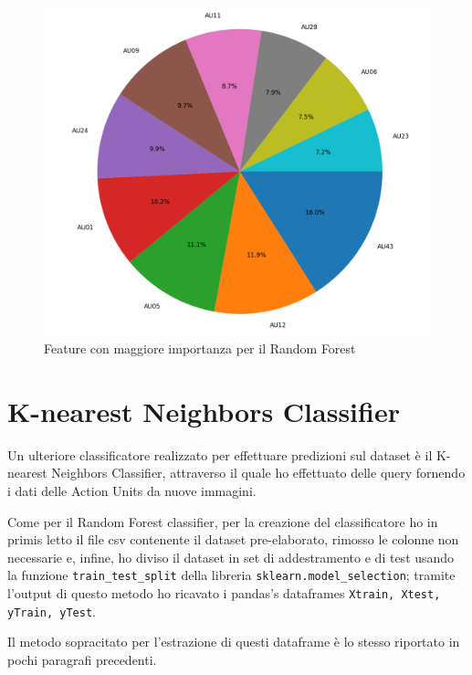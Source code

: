 \begin{figure}
    \begin{center}    
        \includegraphics[width=1\linewidth]{images/image37.png}
        \caption{Feature con maggiore importanza per il Random Forest}
        \label{fig:image14}
    \end{center}
\end{figure}

\section{K-nearest Neighbors Classifier}
Un ulteriore classificatore realizzato per effettuare predizioni sul dataset è il K-nearest Neighbors Classifier, attraverso il quale ho effettuato delle query fornendo i dati delle Action Units da nuove immagini.

Come per il Random Forest classifier, per la creazione del classificatore ho in primis letto il file csv contenente il dataset pre-elaborato, rimosso le colonne non necessarie e, infine, ho diviso il dataset in set di addestramento e di test usando la funzione \texttt{train_test_split} della libreria \texttt{sklearn.model_selection}; tramite l’output di questo metodo ho ricavato i pandas’s dataframes \texttt{Xtrain, Xtest, yTrain, yTest}.

Il metodo sopracitato per l’estrazione di questi dataframe è lo stesso riportato in pochi paragrafi precedenti.

